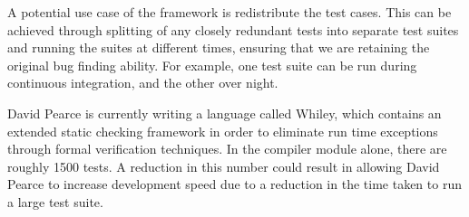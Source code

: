 A potential use case of the framework is redistribute the test cases. This can be achieved through splitting of any closely redundant tests into separate test suites and running the suites at different times, ensuring that we are retaining the original bug finding ability. For example, one test suite can be run during continuous integration, and the other over night.

David Pearce is currently writing a language called Whiley, which contains an extended static checking framework in order to eliminate run time exceptions through formal verification techniques. In the compiler module alone, there are roughly 1500 tests. A reduction in this number could result in allowing David Pearce to increase development speed due to a reduction in the time taken to run a large test suite. 